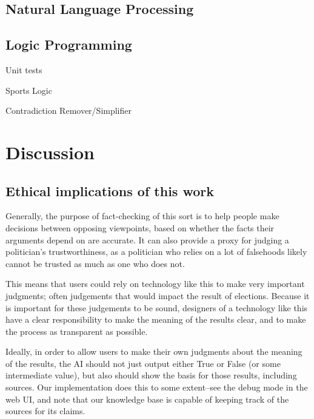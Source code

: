 \documentclass{chi2009}
\begin{document}

\subsection{Natural Language Processing}

\subsection{Logic Programming}

Unit tests

Sports Logic

Contradiction Remover/Simplifier

\section{Discussion}

\subsection{Ethical implications of this work}

Generally, the purpose of fact-checking of this sort is to help people make decisions between opposing viewpoints, based on whether the facts their arguments depend on are accurate.
It can also provide a proxy for judging a politician's trustworthiness, as a politician who relies on a lot of falsehoods likely cannot be trusted as much as one who does not.

This means that users could rely on technology like this to make very important judgments; often judgements that would impact the result of elections.
Because it is important for these judgements to be sound, designers of a technology like this have a clear responsibility to make the meaning of the results clear, and to make the process as transparent as possible.

Ideally, in order to allow users to make their own judgments about the meaning of the results, the AI should not just output either True or False (or some intermediate value), but also should show the basis for those results, including sources.
Our implementation does this to some extent--see the debug mode in the web UI, and note that our knowledge base is capable of keeping track of the sources for its claims.
\end{document}
